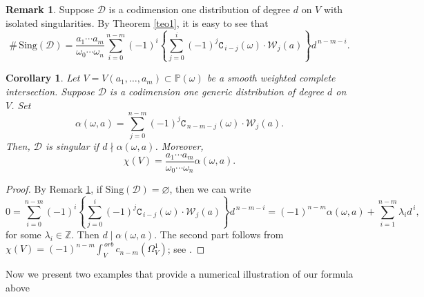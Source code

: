 \documentclass[11pt]{amsart}
\theoremstyle{plain}
\newtheorem{cor}{Corollary}[section]
\theoremstyle{definition}
\newtheorem{obs}{Remark}[section]
\begin{document}

\begin{obs} \label{ob1} 
Suppose $\mathcal{D}$ is a codimension one distribution of degree $d$ on $V$ with isolated singularities.
By Theorem \ref{teo1}, it is easy to see that
$$
\#\,\mathrm{Sing}(\mathcal{D})
=\frac{a_1\cdots a_m}{\omega_0\cdots\omega_n}\sum_{i=0}^{n-m}(-1)^i
\left\{\sum_{j=0}^i(-1)^j\texttt{C}_{\,i-j}(\omega)\cdot\mathcal{W}_j(a)\right\}d^{\,n-m-i}.
$$
\end{obs}

\begin{cor} \label{co1} 
Let $V=V(a_1,\ldots,a_m)\subset\mathbb{P}(\omega)$ be a smooth weighted complete intersection.
Suppose $\mathcal{D}$ is a codimension one generic distribution of degree $d$ on $V$. Set
$$\alpha(\omega,a)=\sum_{j=0}^{n-m}(-1)^j\texttt{C}_{\,n-m-j}(\omega)\cdot\mathcal{W}_j(a).$$
Then, $\mathcal{D}$ is singular if $d\nmid\alpha(\omega,a)$. Moreover,
$$\chi(V)=\dfrac{a_1\cdots a_m}{\omega_0\cdots\omega_n}\alpha(\omega,a).$$
\end{cor}

\begin{proof} By Remark \ref{ob1}, if $\mathrm{Sing}\left(\mathcal{D}\right)=\varnothing$, then we can write
$$0=\sum_{i=0}^{n-m}(-1)^i\left\{\sum_{j=0}^i(-1)^j\texttt{C}_{\,i-j}(\omega)\cdot\mathcal{W}_j(a)\right\}d^{\,n-m-i}
=(-1)^{n-m} \alpha(\omega,a) + \sum_{i=1}^{n-m}\lambda_i d^{\,i},$$
for some $\lambda_i\in\mathbb{Z}$. Then $d \mid \alpha(\omega,a)$.
The second part follows from $\chi(V)=(-1)^{n-m}\int^{\,orb}_Vc_{n-m}\left(\Omega_{V}^1\right)$; see \cite{Bla}.
\end{proof}

\vspace{0,1cm}

Now we present two examples that provide a numerical illustration of our formula above 
\end{document}
